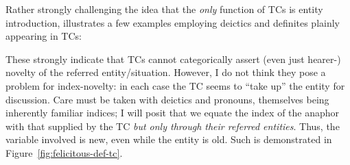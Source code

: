 \documentclass[11pt]{article}
\begin{document}
Rather strongly challenging the idea that the \textit{only} function of TCs is entity introduction, \citet{abbottDefinitenessExistentials1997} illustrates a few examples employing deictics and definites plainly appearing in TCs:

\begin{exe}
\end{exe}

These strongly indicate that TCs cannot categorically assert (even just hearer-) novelty of the referred entity/situation. However, I do not think they pose a problem for index-novelty: in each case the TC seems to ``take up'' the entity for discussion. Care must be taken with deictics and pronouns, themselves being inherently familiar indices; I will posit that we equate the index of the anaphor with that supplied by the TC \textit{but only through their referred entities}. Thus, the variable involved is new, even while the entity is old. Such is demonstrated in Figure~\ref{fig:felicitous-def-tc}.
\end{document}
